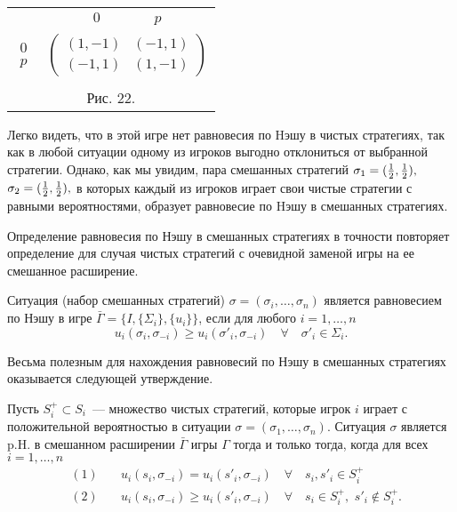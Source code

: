 {\begin{center}
\begin{tabular}{cc}
&$\begin{array}{cc} 0\qquad&\quad p\end{array}$\\
$\begin{array}{c} 0\\p\end{array}$& $\left(\begin{array}{cc}
(1,-1)&(-1,1)\\
(-1,1)&(1,-1) \end{array}\right)$\\
\multicolumn{2}{c}{}\\
\multicolumn{2}{c}{Рис. 22.}\\
\end{tabular}
\end{center}

Легко видеть, что в этой игре нет равновесия по Hэшу в чистых
стратегиях, так как в любой ситуации одному из игроков выгодно
отклониться от выбранной стратегии. Однако, как мы увидим, пара
смешанных стратегий $\sigma_1=({1\over 2},{1\over 2}),$
$\sigma_2=({1\over 2},{1\over 2}),$ в которых каждый из игроков
играет свои чистые стратегии с равными вероятностями, образует
равновесие по Hэшу в смешанных стратегиях.

Определение равновесия по Нэшу в смешанных стратегиях в точности
повторяет определение для случая чистых стратегий с очевидной
заменой игры на ее смешанное расширение.

\begin{definition}
Ситуация (набор смешанных стратегий)
$\sigma=(\sigma_i,\ldots,\sigma_n)$ является равновесием по Нэшу в
игре $\bar\Gamma=\{I,\{\Sigma_i\},\{u_i\}\}$, если для любого
$i=1,\ldots,n$
$$
u_i(\sigma_i,\sigma_{-i})\ge u_i(\sigma'_i,\sigma_{-
i})\quad\forall\quad\sigma'_i\in\Sigma_i.
$$
\end{definition}

Весьма полезным для нахождения равновесий по Нэшу в смешанных
стратегиях оказывается следующей утверждение.

\begin{proposition}
Пусть $S^+_i\subset S_i$~---  множество чистых стратегий, которые
игрок $i$ играет с положительной вероятностью в ситуации
$\sigma=(\sigma_1,\ldots,\sigma_n)$.  Ситуация $\sigma$ является
p.H. в смешанном расширении $\bar\Gamma$ игры $\Gamma$ тогда и
только тогда, когда для всех $i=1,\ldots,n$
$$
\begin{array}{rcl} &(1)&\quad
u_i(s_i,\sigma_{-i})=u_i(s'_i,\sigma_{-i})\quad\forall\quad
s_i,s'_i\in
S_i^+\\[10pt]
&(2)&\quad u_i(s_i,\sigma_{-i})\ge u_i(s'_i,\sigma_{-i})\quad
\forall\quad s_i\in S^+_i,\,\,s'_i\notin S_i^+. \end{array}
$$
\end{proposition}

}
